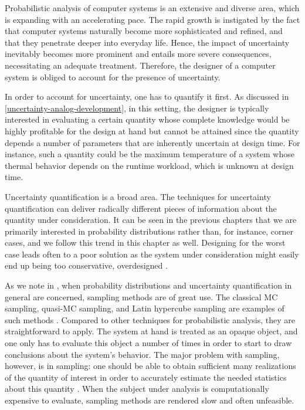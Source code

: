 Probabilistic analysis of computer systems is an extensive and diverse area,
which is expanding with an accelerating pace. The rapid growth is instigated by
the fact that computer systems naturally become more sophisticated and refined,
and that they penetrate deeper into everyday life. Hence, the impact of
uncertainty inevitably becomes more prominent and entails more severe
consequences, necessitating an adequate treatment. Therefore, the designer of a
computer system is obliged to account for the presence of uncertainty.

In order to account for uncertainty, one has to quantify it first. As discussed
in \cref{uncertainty-analog-development}, in this setting, the designer is
typically interested in evaluating a certain quantity whose complete knowledge
would be highly profitable for the design at hand but cannot be attained since
the quantity depends a number of parameters that are inherently uncertain at
design time. For instance, such a quantity could be the maximum temperature of a
system whose thermal behavior depends on the runtime workload, which is unknown
at design time.

Uncertainty quantification \cite{maitre2010} is a broad area. The techniques for
uncertainty quantification can deliver radically different pieces of information
about the quantity under consideration. It can be seen in the previous chapters
that we are primarily interested in probability distributions rather than, for
instance, corner cases, and we follow this trend in this chapter as well.
Designing for the worst case leads often to a poor solution as the system under
consideration might easily end up being too conservative, overdesigned
\cite{quinton2012}.

As we note in , when probability distributions and uncertainty
quantification in general are concerned, sampling methods are of great use. The
classical \ac{MC} sampling, quasi-\ac{MC} sampling, and Latin hypercube sampling
are examples of such methods \cite{asmussen2007}. Compared to other techniques
for probabilistic analysis, they are straightforward to apply. The system at
hand is treated as an opaque object, and one only has to evaluate this object a
number of times in order to start to draw conclusions about the system's
behavior. The major problem with sampling, however, is in sampling: one should
be able to obtain sufficient many realizations of the quantity of interest in
order to accurately estimate the needed statistics about this quantity
\cite{diaz-emparanza2002}. When the subject under analysis is computationally
expensive to evaluate, sampling methods are rendered slow and often unfeasible.

